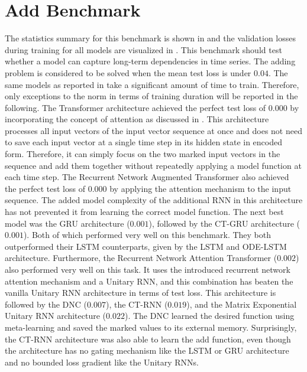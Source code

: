 \documentclass[draft,final]{vutinfth} %
\begin{document}
    \section{Add Benchmark} \label{add_results}
    The statistics summary for this benchmark is shown in  and the validation losses during training for all models are visualized in .
    This benchmark should test whether a model can capture long-term dependencies in time series.
    The adding problem is considered to be solved when the mean test loss is under $0.04$.
    The same models as reported in  take a significant amount of time to train. Therefore, only exceptions to the norm in terms of training duration will be reported in the following.
    The Transformer architecture achieved the perfect test loss of $0.000$ by incorporating the concept of attention as discussed in .
    This architecture processes all input vectors of the input vector sequence at once and does not need to save each input vector at a single time step in its hidden state in encoded form.
    Therefore, it can simply focus on the two marked input vectors in the sequence and add them together without repeatedly applying a model function at each time step.
    The Recurrent Network Augmented Transformer also achieved the perfect test loss of $0.000$ by applying the attention mechanism to the input sequence.
    The added model complexity of the additional RNN in this architecture has not prevented it from learning the correct model function.
    The next best model was the GRU architecture ($0.001$), followed by the CT-GRU architecture ($0.001$). Both of which performed very well on this benchmark.
    They both outperformed their LSTM counterparts, given by the LSTM and ODE-LSTM architecture.
    Furthermore, the Recurrent Network Attention Transformer ($0.002$) also performed very well on this task.
    It uses the introduced recurrent network attention mechanism and a Unitary RNN, and this combination has beaten the vanilla Unitary RNN architecture in terms of test loss.
    This architecture is followed by the DNC ($0.007$), the CT-RNN ($0.019$), and the Matrix Exponential Unitary RNN architecture ($0.022$).
    The DNC learned the desired function using meta-learning and saved the marked values to its external memory. Surprisingly, the CT-RNN architecture was also able to learn the add function, even though the architecture has no gating mechanism like the LSTM or GRU architecture and no bounded loss gradient like the Unitary RNNs.
\end{document}
